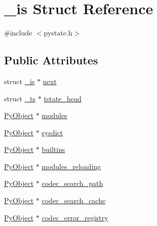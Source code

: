 \hypertarget{struct__is}{}\section{\+\_\+is Struct Reference}
\label{struct__is}


{\ttfamily \#include $<$pystate.\+h$>$}

\subsection*{Public Attributes}
\begin{DoxyCompactItemize}
\item 
struct \mbox{\hyperlink{struct__is}{\+\_\+is}} $\ast$ \mbox{\hyperlink{struct__is_a1c3d238e47f3b06f3dcc161e18145e4a}{next}}
\item 
struct \mbox{\hyperlink{struct__ts}{\+\_\+ts}} $\ast$ \mbox{\hyperlink{struct__is_a0691d58c38c8286ac6dbceb6aa98bd09}{tstate\+\_\+head}}
\item 
\mbox{\hyperlink{_python27_2object_8h_aadc84ac7aed2cfa6f20c25f62bf3dac7}{Py\+Object}} $\ast$ \mbox{\hyperlink{struct__is_a7f06027c7ab7541936413d7d91eac5fb}{modules}}
\item 
\mbox{\hyperlink{_python27_2object_8h_aadc84ac7aed2cfa6f20c25f62bf3dac7}{Py\+Object}} $\ast$ \mbox{\hyperlink{struct__is_a95556056d8c72409c77f50896b610110}{sysdict}}
\item 
\mbox{\hyperlink{_python27_2object_8h_aadc84ac7aed2cfa6f20c25f62bf3dac7}{Py\+Object}} $\ast$ \mbox{\hyperlink{struct__is_aed5b927da76a3c44b320b5faf68db0f5}{builtins}}
\item 
\mbox{\hyperlink{_python27_2object_8h_aadc84ac7aed2cfa6f20c25f62bf3dac7}{Py\+Object}} $\ast$ \mbox{\hyperlink{struct__is_a6a0f493b1eaa633105739d733a04412e}{modules\+\_\+reloading}}
\item 
\mbox{\hyperlink{_python27_2object_8h_aadc84ac7aed2cfa6f20c25f62bf3dac7}{Py\+Object}} $\ast$ \mbox{\hyperlink{struct__is_ac1d3848054d54f616334ffc47b560fad}{codec\+\_\+search\+\_\+path}}
\item 
\mbox{\hyperlink{_python27_2object_8h_aadc84ac7aed2cfa6f20c25f62bf3dac7}{Py\+Object}} $\ast$ \mbox{\hyperlink{struct__is_aa85c05fed3a236e56918fe0c832c3c98}{codec\+\_\+search\+\_\+cache}}
\item 
\mbox{\hyperlink{_python27_2object_8h_aadc84ac7aed2cfa6f20c25f62bf3dac7}{Py\+Object}} $\ast$ \mbox{\hyperlink{struct__is_a98cfa3eae066203fcfc5b884914d6daf}{codec\+\_\+error\+\_\+registry}}
\end{DoxyCompactItemize}


